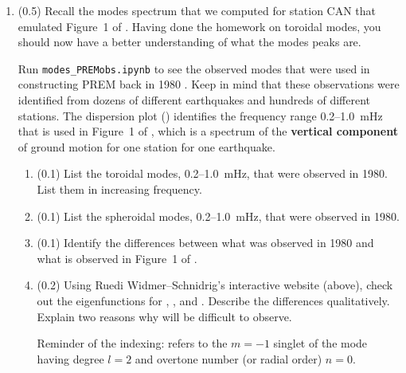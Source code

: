 \documentclass[11pt,titlepage,fleqn]{article}
\newcommand{\tfilelab}{{\tt lab\_sumatraB.ipynb}}
\begin{document}
\begin{enumerate}
\item (0.5) Recall the modes spectrum that we computed for station CAN that emulated Figure~1 of \citet{Park2005}. Having done the homework on toroidal modes, you should now have a better understanding of what the modes peaks are.

Run \verb+modes_PREMobs.ipynb+ to see the observed modes that were used in constructing PREM back in 1980 \citep{PREM}. Keep in mind that these observations were identified from dozens of different earthquakes and hundreds of different stations.
The dispersion plot () identifies the frequency range 0.2--1.0~mHz that is used in Figure~1 of \citet{Park2005}, which is a spectrum of the {\bf vertical component} of ground motion for one station for one earthquake.
%
\begin{enumerate}
\item (0.1) List the toroidal modes, 0.2--1.0~mHz, that were observed in 1980. \\
List them in increasing frequency.
\item (0.1) List the spheroidal modes, 0.2--1.0~mHz, that were observed in 1980.
\item (0.1) Identify the differences between what was observed in 1980 and what is observed in Figure~1 of \citet{Park2005}.
\item (0.2) Using Ruedi Widmer--Schnidrig's interactive website (above), check out the eigenfunctions for , , and . Describe the differences qualitatively. Explain two reasons why  will be difficult to observe.

Reminder of the indexing:  refers to the $m=-1$ singlet of the mode having degree $l=2$ and overtone number (or radial order) $n=0$.
\end{enumerate}




\end{enumerate}
\end{document}

